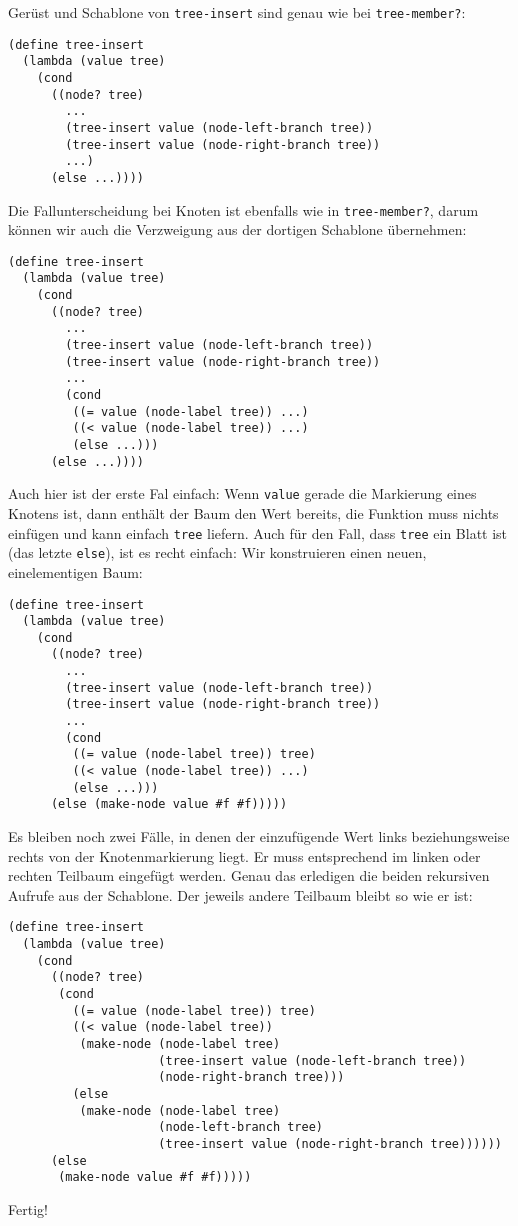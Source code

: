 Gerüst und
Schablone von \lstinline{tree-insert} sind genau wie bei \lstinline{tree-member?}:
%
\begin{lstlisting}
(define tree-insert
  (lambda (value tree)
    (cond
      ((node? tree)
        ...
        (tree-insert value (node-left-branch tree))
        (tree-insert value (node-right-branch tree))
        ...)
      (else ...))))
\end{lstlisting}
%
Die Fallunterscheidung bei Knoten ist ebenfalls wie in
\lstinline{tree-member?}, darum können wir auch die Verzweigung aus
der dortigen Schablone übernehmen:
%
\begin{lstlisting}
(define tree-insert
  (lambda (value tree)
    (cond
      ((node? tree)
        ...
        (tree-insert value (node-left-branch tree))
        (tree-insert value (node-right-branch tree))
        ...
        (cond
         ((= value (node-label tree)) ...)
         ((< value (node-label tree)) ...)
         (else ...)))
      (else ...))))
\end{lstlisting}
%
Auch hier ist der erste Fal einfach: Wenn \lstinline{value} gerade die
Markierung eines Knotens ist, dann enthält der Baum den Wert bereits,
die Funktion muss nichts einfügen und kann einfach \lstinline{tree}
liefern.  Auch für den Fall, dass \lstinline{tree} ein Blatt ist (das
letzte \lstinline{else}), ist es recht einfach: Wir konstruieren einen
neuen, einelementigen Baum:
%
\begin{lstlisting}
(define tree-insert
  (lambda (value tree)
    (cond
      ((node? tree)
        ...
        (tree-insert value (node-left-branch tree))
        (tree-insert value (node-right-branch tree))
        ...
        (cond
         ((= value (node-label tree)) tree)
         ((< value (node-label tree)) ...)
         (else ...)))
      (else (make-node value #f #f)))))
\end{lstlisting}
%
Es bleiben noch zwei Fälle, in denen der einzufügende Wert links
beziehungsweise rechts von der Knotenmarkierung liegt.  Er muss
entsprechend im linken oder rechten Teilbaum eingefügt werden. Genau
das erledigen die beiden rekursiven Aufrufe aus der Schablone.  Der
jeweils andere Teilbaum bleibt so wie er ist:
%
\begin{lstlisting}
(define tree-insert
  (lambda (value tree)
    (cond
      ((node? tree)
       (cond
         ((= value (node-label tree)) tree)
         ((< value (node-label tree))
          (make-node (node-label tree)
                     (tree-insert value (node-left-branch tree))
                     (node-right-branch tree)))
         (else
          (make-node (node-label tree)
                     (node-left-branch tree)
                     (tree-insert value (node-right-branch tree))))))
      (else
       (make-node value #f #f)))))
\end{lstlisting}
%
Fertig!


